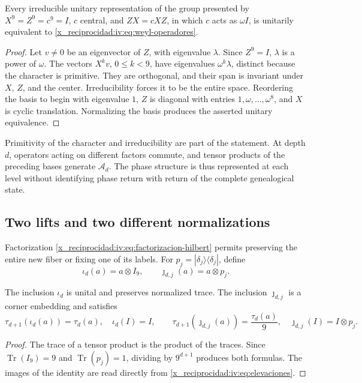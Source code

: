 \begin{theorem}
\label{x_reciprocidad:iv:thm:weyl-unicidad}
Every irreducible unitary representation of the group presented by
\(X^9=Z^9=c^9=I\), \(c\) central, and \(ZX=cXZ\), in which
\(c\) acts as \(\omega I\), is unitarily equivalent to
\eqref{x_reciprocidad:iv:eq:weyl-operadores}.
\end{theorem}
\begin{proof}
Let \(v\neq0\) be an eigenvector of \(Z\), with eigenvalue \(\lambda\).
Since \(Z^9=I\), \(\lambda\) is a power of \(\omega\).
The vectors \(X^kv\), \(0\leq k<9\), have eigenvalues
\(\omega^k\lambda\), distinct because the character is primitive.
They are orthogonal, and their span is invariant under \(X\),
\(Z\), and the center. Irreducibility forces it to be the entire
space. Reordering the basis to begin with eigenvalue \(1\),
\(Z\) is diagonal with entries \(1,\omega,\ldots,\omega^8\),
and \(X\) is cyclic translation. Normalizing the basis
produces the asserted unitary equivalence.
\end{proof}

Primitivity of the character and irreducibility are part of the
statement. At depth \(d\), operators acting on different
factors commute, and tensor products of the preceding bases
generate \(\mathcal A_d\). The phase structure is thus
represented at each level without identifying phase return with
return of the complete genealogical state.

\subsection{Two lifts and two different normalizations}

Factorization \eqref{x_reciprocidad:iv:eq:factorizacion-hilbert} permits preserving
the entire new fiber or fixing one of its labels. For
\(p_j=|\delta_j\rangle\langle\delta_j|\), define
\begin{equation}
 \iota_d(a)=a\otimes I_9,
 \qquad \jmath_{d,j}(a)=a\otimes p_j.
 \label{x_reciprocidad:iv:eq:elevaciones}
\end{equation}
\begin{proposition}
\label{x_reciprocidad:iv:prop:unidad-traza}
The inclusion \(\iota_d\) is unital and preserves normalized trace.
The inclusion \(\jmath_{d,j}\) is a corner embedding and
satisfies
\[
 \tau_{d+1}(\iota_d(a))=\tau_d(a),\quad \iota_d(I)=I,
 \qquad
 \tau_{d+1}(\jmath_{d,j}(a))=\frac{\tau_d(a)}9,
 \quad \jmath_{d,j}(I)=I\otimes p_j.
\]
\end{proposition}
\begin{proof}
The trace of a tensor product is the product of the traces.
Since \(\operatorname{Tr}(I_9)=9\) and
\(\operatorname{Tr}(p_j)=1\), dividing by \(9^{d+1}\)
produces both formulas. The images of the identity are read
directly from \eqref{x_reciprocidad:iv:eq:elevaciones}.
\end{proof}

